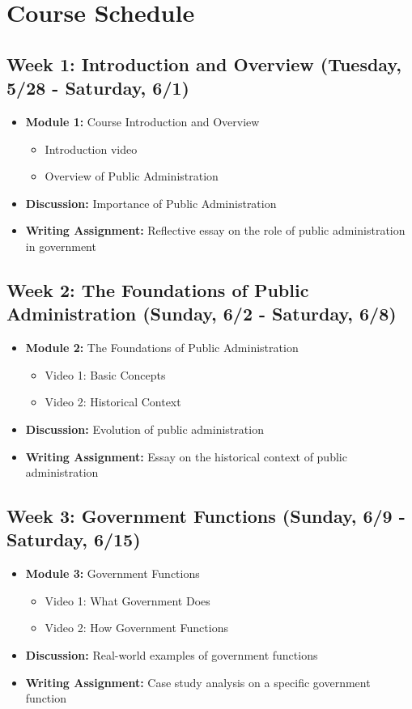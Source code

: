 \documentclass[12pt, letterpaper]{article}
\begin{document}
\section{Course Schedule}

\subsection*{Week 1: Introduction and Overview (Tuesday, 5/28 - Saturday, 6/1)}
\begin{itemize}
    \item \textbf{Module 1:} Course Introduction and Overview
    \begin{itemize}
        \item Introduction video
        \item Overview of Public Administration
    \end{itemize}
    \item \textbf{Discussion:} Importance of Public Administration
    \item \textbf{Writing Assignment:} Reflective essay on the role of public administration in government
\end{itemize}

\subsection*{Week 2: The Foundations of Public Administration (Sunday, 6/2 - Saturday, 6/8)}
\begin{itemize}
    \item \textbf{Module 2:} The Foundations of Public Administration
    \begin{itemize}
        \item Video 1: Basic Concepts
        \item Video 2: Historical Context
    \end{itemize}
    \item \textbf{Discussion:} Evolution of public administration
    \item \textbf{Writing Assignment:} Essay on the historical context of public administration
\end{itemize}

\subsection*{Week 3: Government Functions (Sunday, 6/9 - Saturday, 6/15)}
\begin{itemize}
    \item \textbf{Module 3:} Government Functions
    \begin{itemize}
        \item Video 1: What Government Does
        \item Video 2: How Government Functions
    \end{itemize}
    \item \textbf{Discussion:} Real-world examples of government functions
    \item \textbf{Writing Assignment:} Case study analysis on a specific government function
\end{itemize}
\end{document}
